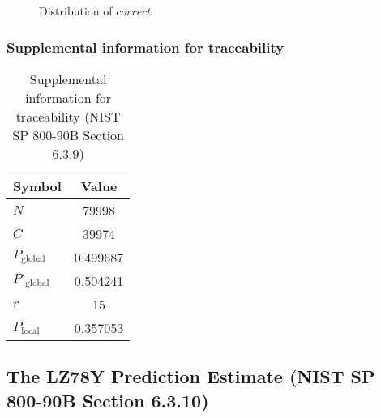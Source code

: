 \documentclass[a3paper,xelatex,english]{bxjsarticle}
\begin{document}
\begin{figure}[htbp]
\centering

\caption{Distribution of $correct$}
\end{figure}
\subsubsection{Supplemental information for traceability}
\renewcommand{\arraystretch}{1.8}
\begin{table}[h]
\caption{Supplemental information for traceability (NIST SP 800-90B Section 6.3.9)}
\begin{center}
\begin{tabular}{|l|c|}
\hline 
\rowcolor{anotherlightblue} %
Symbol				& Value \\ \hline 
$N$				& 79998\\ \hline 
$C$				& 39974\\ \hline 
$P_{\textrm{global}}$				& 0.499687\\ \hline 
$P'_{\textrm{global}}$			& 0.504241\\ \hline 
$r$				& 15\\ \hline 
$P_{\textrm{local}}$ 			& 0.357053\\ \hline
\end{tabular}
\end{center}
\end{table}
\renewcommand{\arraystretch}{1.4}
\clearpage
\subsection{The LZ78Y Prediction Estimate (NIST SP 800-90B Section 6.3.10)}\label{sec:Binary6310}
\end{document}
